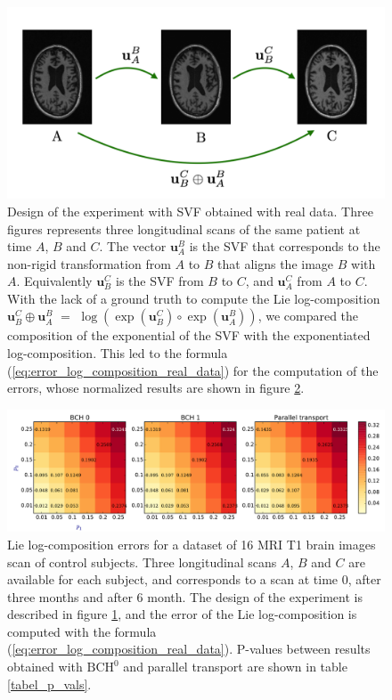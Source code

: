 \begin{figure}[!ht]
	\centering
	\includegraphics[scale=0.25]{figures/three_brains_problem.pdf}
	\caption{Design of the experiment with SVF obtained with real data. Three figures represents three  longitudinal scans of the same patient at time $A$, $B$ and $C$. The vector $\mathbf{u}_{A}^{B}$ is the SVF that corresponds to the non-rigid transformation from $A$ to $B$ that aligns the image $B$ with $A$. Equivalently $\mathbf{u}_{B}^{C}$ is the SVF from $B$ to $C$, and $\mathbf{u}_{A}^{C}$ from $A$ to $C$. 
	With the lack of a ground truth to compute the Lie log-composition $\mathbf{u}_{B}^{C} \oplus \mathbf{u}_{A}^{B}$ $=$
	$\log(\exp(\mathbf{u}_{B}^{C}) \circ\exp(\mathbf{u}_{A}^{B}))$, we compared the composition of the exponential of the SVF with the exponentiated log-composition. This led to the formula (\ref{eq:error_log_composition_real_data}) for the computation of the errors, whose normalized results are shown in figure \ref{fig:svf_log_composition_real_data_CTL_expo}. }
	\label{fig:three_brains_problem}
\end{figure}

\begin{figure}[!ht]
	\hspace{-1.0cm}
	\includegraphics[scale=0.53]{figures/svf_log_composition_real_data_CTL_expo.pdf}
	\caption{Lie log-composition errors for a dataset of 16 MRI T1 brain images scan of control subjects. Three longitudinal scans $A$, $B$ and $C$ are available for each subject, and corresponds to a scan at time $0$, after three months and after $6$ month. The design of the experiment is described in figure \ref{fig:three_brains_problem}, and the error of the Lie log-composition is computed with the formula (\ref{eq:error_log_composition_real_data}). P-values between results obtained with $\text{BCH}^{0}$ and parallel transport are shown in table \ref{tabel_p_vals}.}
	\label{fig:svf_log_composition_real_data_CTL_expo}
\end{figure}

